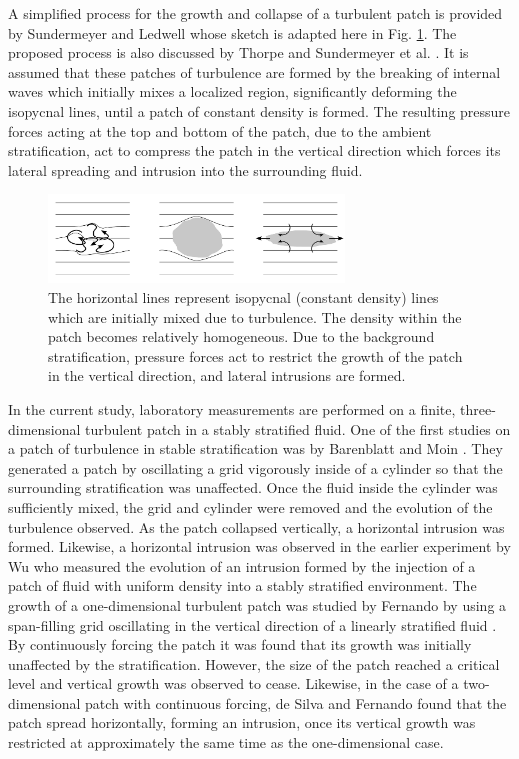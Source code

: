 \documentclass{piv13-abstract}
\newcommand{\figLabel}{Fig. }
\begin{document}
A simplified process for the growth and collapse of a turbulent patch is provided by Sundermeyer and Ledwell \cite{Sundermeyer2001} whose sketch is adapted here in \figLabel\ref{fig:thorpe}. The proposed process is also discussed by Thorpe \cite{bookThorpe2005} and Sundermeyer et al. \cite{Sundermeyer2005}. It is assumed that these patches of turbulence are formed by the breaking of internal waves \cite{Garrett1972,Garrett1979} which initially mixes a localized region, significantly deforming the isopycnal lines, until a patch of constant density is formed. The resulting pressure forces acting at the top and bottom of the patch, due to the ambient stratification, act to compress the patch in the vertical direction which forces its lateral spreading and intrusion into the surrounding fluid. 

\begin{figure}[ht]
\centering
\includegraphics[width=0.7\textwidth]{figures/thorpesvg.pdf}
\caption{The horizontal lines represent isopycnal (constant density) lines which are initially mixed due to turbulence. The density within the patch becomes relatively homogeneous. Due to the background stratification, pressure forces act to restrict the growth of the patch in the vertical direction, and lateral intrusions are formed. \label{fig:thorpe}}
\end{figure}

In the current study, laboratory measurements are performed on a finite, three-dimensional turbulent patch in a stably stratified fluid. One of the first studies on a patch of turbulence in stable stratification was by Barenblatt and Moin \cite{Barenblatt1979}. They generated a patch by oscillating a grid vigorously inside of a cylinder so that the surrounding stratification was unaffected. Once the fluid inside the cylinder was sufficiently mixed, the grid and cylinder were removed and the evolution of the turbulence observed. As the patch collapsed vertically, a horizontal intrusion was formed. Likewise, a horizontal intrusion was observed in the earlier experiment by Wu \cite{Wu1969} who measured the evolution of an intrusion formed by the injection of a patch of fluid with uniform density into a stably stratified environment. The growth of a one-dimensional turbulent patch was studied by Fernando \cite{Fernando1988} by using a span-filling grid oscillating in the vertical direction of a linearly stratified fluid .  By continuously forcing the patch it was found that its growth was initially unaffected by the stratification.  However, the size of the patch reached a critical level and vertical growth was observed to cease.  Likewise, in the case of a two-dimensional patch with continuous forcing, de Silva and Fernando \cite{Silva1998} found that the patch spread horizontally, forming an intrusion, once its vertical growth was restricted at approximately the same time as the one-dimensional case. 
\end{document}
